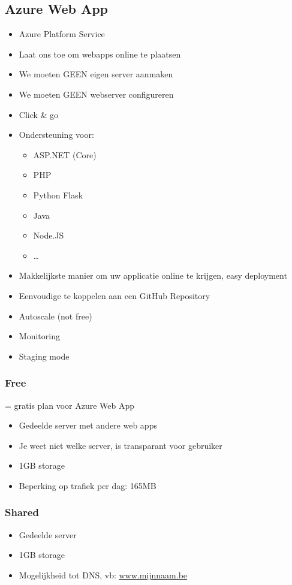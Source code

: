 \documentclass{article}
\begin{document}
\subsection{Azure Web App}
\begin{itemize}
    \item Azure Platform Service
    \item Laat ons toe om webapps online te plaatsen
    \item We moeten GEEN eigen server aanmaken
    \item We moeten GEEN webserver configureren
    \item Click \& go
    \item Ondersteuning voor:
    \begin{itemize}
        \item ASP.NET (Core)
        \item PHP
        \item Python Flask
        \item Java
        \item Node.JS
        \item \dots
    \end{itemize}
    \item Makkelijkste manier om uw applicatie online te krijgen, easy deployment
    \item Eenvoudige te koppelen aan een GitHub Repository
    \item Autoscale (not free)
    \item Monitoring
    \item Staging mode
\end{itemize}

\subsubsection{Free}
= gratis plan voor Azure Web App

\begin{itemize}
    \item Gedeelde server met andere web apps
    \item Je weet niet welke server, is transparant voor gebruiker
    \item 1GB storage
    \item Beperking op trafiek per dag: 165MB
\end{itemize}

\subsubsection{Shared}
\begin{itemize}
    \item Gedeelde server
    \item 1GB storage
    \item Mogelijkheid tot DNS, vb: \underline{www.mijnnaam.be}
\end{itemize}
\end{document}

